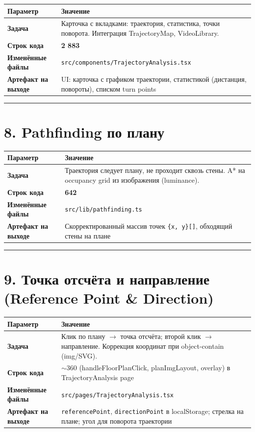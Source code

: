 \documentclass[12pt,a4paper]{article}
\begin{document}
\begin{tabular}{>{\bfseries}l p{10cm}}
\toprule
Параметр & Значение \\
\midrule
Задача & Карточка с вкладками: траектория, статистика, точки поворота. Интеграция TrajectoryMap, VideoLibrary. \\
Строк кода & \textbf{2 883} \\
Изменённые файлы & \texttt{src/components/TrajectoryAnalysis.tsx} \\
Артефакт на выходе & UI: карточка с графиком траектории, статистикой (дистанция, повороты), списком turn points \\
\bottomrule
\end{tabular}

\vspace{1em}
\hrule
\vspace{1em}

\section{8. Pathfinding по плану}

\begin{tabular}{>{\bfseries}l p{10cm}}
\toprule
Параметр & Значение \\
\midrule
Задача & Траектория следует плану, не проходит сквозь стены. A* на occupancy grid из изображения (luminance). \\
Строк кода & \textbf{642} \\
Изменённые файлы & \texttt{src/lib/pathfinding.ts} \\
Артефакт на выходе & Скорректированный массив точек \texttt{\{x, y\}[]}, обходящий стены на плане \\
\bottomrule
\end{tabular}

\vspace{1em}
\hrule
\vspace{1em}

\section{9. Точка отсчёта и направление (Reference Point \& Direction)}

\begin{tabular}{>{\bfseries}l p{10cm}}
\toprule
Параметр & Значение \\
\midrule
Задача & Клик по плану $\rightarrow$ точка отсчёта; второй клик $\rightarrow$ направление. Коррекция координат при object-contain (img/SVG). \\
Строк кода & $\sim$360 (handleFloorPlanClick, planImgLayout, overlay) в TrajectoryAnalysis page \\
Изменённые файлы & \texttt{src/pages/TrajectoryAnalysis.tsx} \\
Артефакт на выходе & \texttt{referencePoint}, \texttt{directionPoint} в localStorage; стрелка на плане; угол для поворота траектории \\
\bottomrule
\end{tabular}
\end{document}
